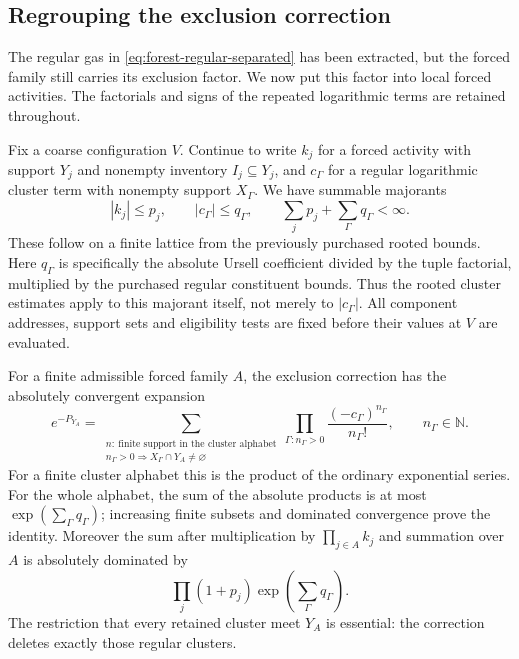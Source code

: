 \subsection{Regrouping the exclusion correction}
\label{sec:forced-exclusion}
The regular gas in \eqref{eq:forest-regular-separated} has been
extracted, but the forced family still carries its exclusion factor.
We now put this factor into local forced activities. The factorials
and signs of the repeated logarithmic terms are retained throughout.

Fix a coarse configuration $V$. Continue to write $k_j$ for a forced
activity with support $Y_j$ and nonempty inventory $I_j\subseteq Y_j$,
and $c_\Gamma$ for a regular logarithmic cluster term with nonempty
support $X_\Gamma$. We have summable majorants
\[
 |k_j|\le p_j,\qquad |c_\Gamma|\le q_\Gamma,\qquad
                  \sum_jp_j+\sum_\Gamma q_\Gamma<\infty.
\]
These follow on a finite lattice from the previously purchased rooted
bounds. Here $q_\Gamma$ is specifically the absolute Ursell coefficient
divided by the tuple factorial, multiplied by the purchased regular
constituent bounds. Thus the rooted cluster estimates apply to this
majorant itself, not merely to $|c_\Gamma|$.
All component addresses, support sets and eligibility tests
are fixed before their values at $V$ are evaluated.

For a finite admissible forced family $A$, the exclusion correction
has the absolutely convergent expansion
\begin{equation}\label{eq:exclusion-multiplicities}
 e^{-P_{Y_A}}=
 \sum_{\substack{n:\ \text{finite support in the cluster alphabet}\\
                n_\Gamma>0\Rightarrow X_\Gamma\cap Y_A\ne\varnothing}}
               \prod_{\Gamma:n_\Gamma>0}
                                   \frac{(-c_\Gamma)^{n_\Gamma}}{n_\Gamma!},
 \qquad n_\Gamma\in\mathbb N.
\end{equation}
For a finite cluster alphabet this is the product of the ordinary
exponential series. For the whole alphabet, the sum of the absolute
products is at most $\exp(\sum_\Gamma q_\Gamma)$; increasing finite
subsets and dominated convergence prove the identity. Moreover the
sum after multiplication by $\prod_{j\in A}k_j$ and summation over
$A$ is absolutely dominated by
\begin{equation}\label{eq:exclusion-absolute}
                 \prod_j(1+p_j)\exp\left(\sum_\Gamma q_\Gamma\right).
\end{equation}
The restriction that every retained cluster meet $Y_A$ is essential:
the correction deletes exactly those regular clusters.

